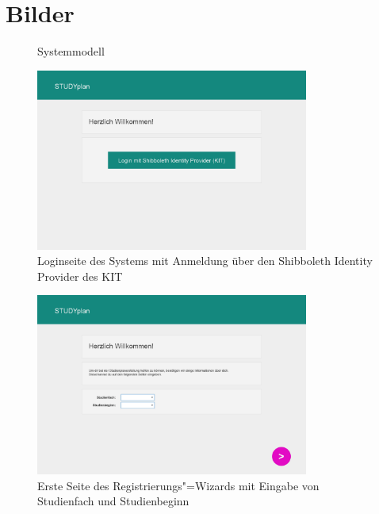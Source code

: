 \newpage
\FloatBarrier
\section{Bilder}
\begin{figure}[!h]
	\caption{Systemmodell}
	\label{system_model:overview}
	\resizebox{\textwidth}{!} {
		
	}
\end{figure}
\begin{figure}[!h]
	\caption{Loginseite des Systems mit Anmeldung über den \gls{Shibboleth Identity Provider} des \gls{KIT}}
	\label{fig:gui-login-1}
	\centering
	\includegraphics[width=0.8\textwidth]{../GUI/ergebnisse/login-1.png}
\end{figure}
\begin{figure}[!h]
	\caption{Erste Seite des Registrierungs"=\gls{Wizard}s mit Eingabe von Studienfach und Studienbeginn}
	\label{fig:gui-registrierung-1}
	\centering
	\includegraphics[width=0.8\textwidth]{../GUI/ergebnisse/registrierung-1.png}
\end{figure}

